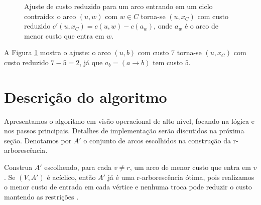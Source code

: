 \begin{figure}[H]\centering
    \caption{Ajuste de custo reduzido para um arco entrando em um ciclo contraído: o arco $(u,w)$ com $w\in C$ torna-se $(u,x_C)$ com custo reduzido $c'(u,x_C)=c(u,w)-c(a_w)$, onde $a_w$ é o arco de menor custo que entra em $w$.}
    \label{fig:chu-liu-reduced-cost}
\end{figure}

A Figura \ref{fig:chu-liu-reduced-cost} mostra o ajuste: o arco \((u,b)\) com custo \(7\) torna-se \((u,x_C)\) com custo reduzido \(7-5=2\), já que \(a_b=(a\to b)\) tem custo \(5\).

\section{Descrição do algoritmo}

Apresentamos o algoritmo em visão operacional de alto nível, focando na lógica e nos passos principais. Detalhes de implementação serão discutidos na próxima seção. Denotamos por \(A'\) o conjunto de arcos escolhidos na construção da r-arborescência.

Construa \(A'\) escolhendo, para cada \(v\neq r\), um arco de menor custo que entra em \(v\). Se \((V,A')\) é acíclico, então \(A'\) já é uma r-arborescência ótima, pois realizamos o menor custo de entrada em cada vértice e nenhuma troca pode reduzir o custo mantendo as restrições \cite[Sec.~4.9]{kleinberg2006}.

